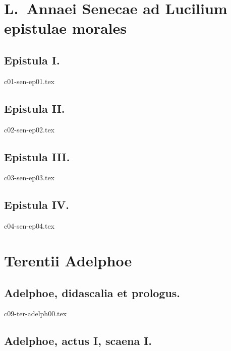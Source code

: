 \documentclass[a4paper,12pt,twoside]{book}
\begin{document}
{
\setlength{\parindent}{0pt}


\part{L.\ Annaei Senecae ad Lucilium epistulae morales}

\chapter{Epistula I.}

{c01-sen-ep01.tex}

\chapter{Epistula II.}

{c02-sen-ep02.tex}

\chapter{Epistula III.}

{c03-sen-ep03.tex}

\chapter{Epistula IV.}

{c04-sen-ep04.tex}






\part{Terentii Adelphoe}

\chapter{Adelphoe, didascalia et prologus.}


{c09-ter-adelph00.tex}

\chapter{Adelphoe, actus I, scaena I.}


}
\end{document}
